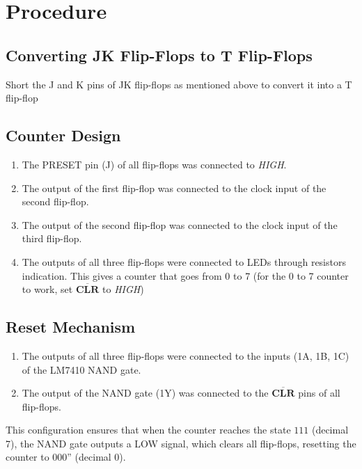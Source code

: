 \documentclass{article}
\begin{document}
\section{Procedure}

\subsection{Converting JK Flip-Flops to T Flip-Flops}
Short the J and K pins of JK flip-flops as mentioned above to convert it into a T flip-flop

\subsection{Counter Design}
\begin{enumerate}
\item The PRESET pin (J) of all flip-flops was connected to \textit{HIGH}.
\item The output of the first flip-flop was connected to the clock input of the second flip-flop.
\item The output of the second flip-flop was connected to the clock input of the third flip-flop.
\item The outputs of all three flip-flops were connected to LEDs through resistors indication.
This gives a counter that goes from 0 to 7 (for the 0 to 7 counter to work, set $\mathbf{\overline{CLR}}$ to \textit{HIGH})
\end{enumerate}

\subsection{Reset Mechanism}
\begin{enumerate}
\item The outputs of all three flip-flops were connected to the inputs (1A, 1B, 1C) of the LM7410 NAND gate.
\item The output of the NAND gate (1Y) was connected to the $\mathbf{\overline{CLR}}$ pins of all flip-flops.
\end{enumerate}

This configuration ensures that when the counter reaches the state $111$ (decimal 7), the NAND gate outputs a LOW signal, which clears all flip-flops, resetting the counter to 000'' (decimal 0).
\end{document}
